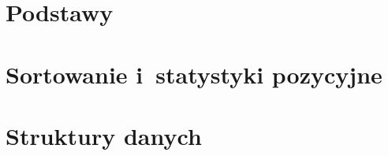 \documentclass[a4paper,10pt,twoside,openany,titlepage]{book}
\begin{document}
\frontmatter




\ifpdf
\fi
\tableofcontents

\let\mychapter=\chapter
\renewcommand{\chapter}[1]{%
	\mychapter{#1}
	\setcounter{subsection}{0}
	\def\thesubsection{\thechapter.\arabic{section}-\arabic{subsection}}
	\lhead[\fancyplain{}{\small\sffamily\bfseries\thepage}]{\fancyplain{}{\small\sffamily\bfseries\rightmark}}
}

\mainmatter

\part{Podstawy}
% 






\part{Sortowanie i~statystyki pozycyjne}






\part{Struktury danych}
\end{document}
